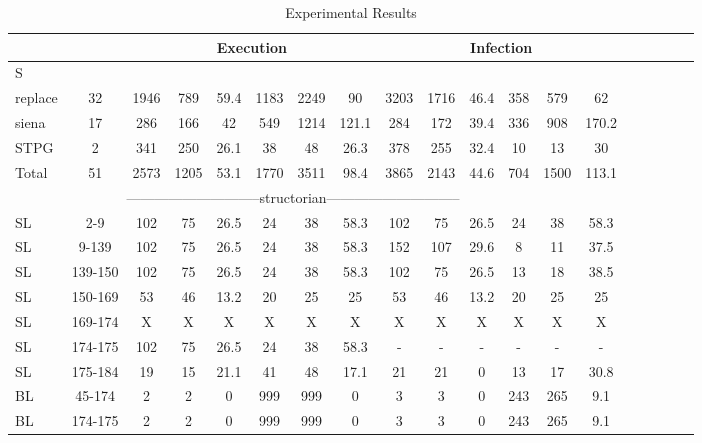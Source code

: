 \begin{table*}
\begin{CodeOut}
\begin{center}
\caption {\label{table:all_results}\scriptsize{Experimental Results}}
\begin {tabular} {|l|c|c|c|c|c|c|c|c|c|c|c|c|c|c|c|c|c|c|}
\hline
&&\multicolumn{6}{|c|}{Execution}&\multicolumn{6}{|c|}{Infection}\\ 
\hline
S &\CenterCell{V} &\CenterCell{$E_{\CodeIn{Pex}}$}&\CenterCell{$E_{\CodeIn{eXpress}}$}&\CenterCell{$E_{Red}(\%)$ }&\CenterCell{$Ne_{\CodeIn{Pex}}$}&\CenterCell{$Ne_{\CodeIn{eXpress}}$}&\CenterCell{$Ne_{Inc}(\%)$}&\CenterCell{$I_{\CodeIn{Pex}}$}&\CenterCell{$I_{\CodeIn{eXpress}}$}&\CenterCell{$I_{Red}(\%)$}&\CenterCell{$Ni_{\CodeIn{Pex}}$}&\CenterCell{$Ni_{\CodeIn{eXpress}}$}&\CenterCell{$Ni_{Inc}(\%)$}\\

\hline
replace&32&1946&789&59.4&1183&2249&90&3203&1716&46.4&358&579&62\\
\hline
siena&17&286&166&42&549&1214&121.1&284&172&39.4&336&908&170.2\\
\hline
STPG&2&341&250&26.1&38&48&26.3&378&255&32.4&10&13&30\\
\hline
Total&51&2573&1205&53.1&1770&3511&98.4&3865&2143&44.6&704&1500&113.1\\
\hline
\multicolumn{13}{|c|}{-----------------------------structorian-----------------------------}&\\
\hline
SL&2-9&102&75&26.5&24&38&58.3&102&75&26.5&24&38&58.3\\
\hline
SL&9-139&102&75&26.5&24&38&58.3&152&107&29.6&8&11&37.5\\
\hline
SL&139-150&102&75&26.5&24&38&58.3&102&75&26.5&13&18&38.5\\
\hline
SL&150-169&53&46&13.2&20&25&25&53&46&13.2&20&25&25\\
\hline
SL&169-174&X&X&X&X&X&X&X&X&X&X&X&X\\
\hline
SL&174-175&102&75&26.5&24&38&58.3&-&-&-&-&-&-\\
\hline
SL&175-184&19&15&21.1&41&48&17.1&21&21&0&13&17&30.8\\
\hline
BL&45-174&2&2&0&999&999&0&3&3&0&243&265&9.1\\
\hline
BL&174-175&2&2&0&999&999&0&3&3&0&243&265&9.1\\
\hline


\end{tabular}
\end{center}
\end{CodeOut}
\end{table*}
